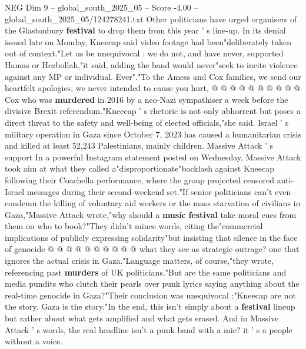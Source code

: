 \begin{textsample}{NEG Dim 9 – global\_south\_2025\_05 – Score -4.00 – global\_south\_2025\_05/124278241.txt}
Other politicians have urged organisers of the Glastonbury \textbf{festival} to drop them from this year ' s line-up.
In its denial issued late on Monday, Kneecap said video footage had been"deliberately taken out of context."Let us be unequivocal : we do not, and have never, supported Hamas or Hezbollah,"it said, adding the band would never"seek to incite violence against any MP or individual.
Ever"."To the Amess and Cox families, we send our heartfelt apologies, we never intended to cause you hurt, @ @ @ @ @ @ @ @ @ @ Cox who was \textbf{murdered} in 2016 by a neo-Nazi sympathiser a week before the divisive Brexit referendum."Kneecap ' s rhetoric is not only abhorrent but poses a direct threat to the safety and well-being of elected officials,"she said.
Israel ' s military operation in Gaza since October 7, 2023 has caused a humanitarian crisis and killed at least 52,243 Palestinians, mainly children.
Massive Attack ' s support In a powerful Instagram statement posted on Wednesday, Massive Attack took aim at what they called a"disproportionate"backlash against Kneecap following their Coachella performance, where the group projected censored anti-Israel messages during their second-weekend set."If senior politicians can't even condemn the killing of voluntary aid workers or the mass starvation of civilians in Gaza,"Massive Attack wrote,"why should a \textbf{music} \textbf{festival} take moral cues from them on who to book?"They didn't mince words, citing the"commercial implications of publicly expressing solidarity"but insisting that silence in the face of genocide @ @ @ @ @ @ @ @ @ @ what they see as strategic outrage? one that ignores the actual crisis in Gaza."Language matters, of course,"they wrote, referencing past \textbf{murders} of UK politicians."But are the same politicians and media pundits who clutch their pearls over punk lyrics saying anything about the real-time genocide in Gaza?"Their conclusion was unequivocal :"Kneecap are not the story.
Gaza is the story."In the end, this isn't simply about a \textbf{festival} lineup but rather about what gets amplified and what gets erased.
And in Massive Attack ' s words, the real headline isn't a punk band with a mic? it ' s a people without a voice.

\end{textsample}
